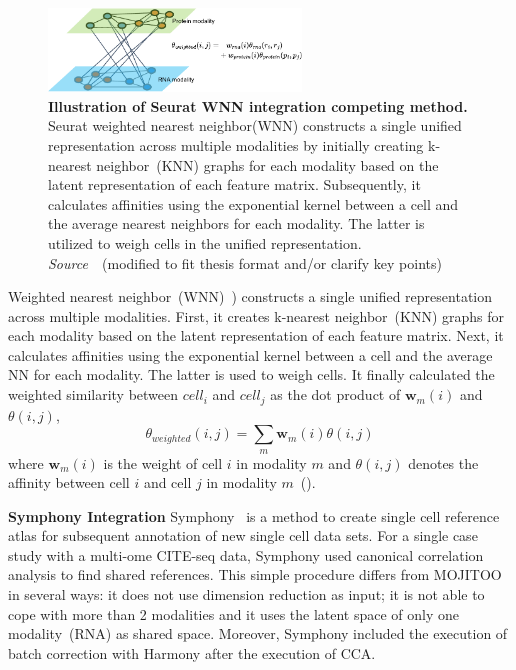 \begin{description}
\begin{figure}[!h]
  	\centering
  	\includegraphics[width=0.60\textwidth]{Alg_WNN/fig}
  	\vspace{0.1cm}
  	\caption[Illustration of Seurat WNN integration competing method.]{\textbf{Illustration of Seurat WNN integration competing method.} Seurat weighted nearest neighbor(WNN) constructs a single unified representation across multiple modalities by initially creating k-nearest neighbor~(KNN) graphs for each modality based on the latent representation of each feature matrix. Subsequently, it calculates affinities using the exponential kernel between a cell and the average nearest neighbors for each modality. The latter is utilized to weigh cells in the unified representation. \emph{Source~\cite{hao2021seurat4}}~(modified to fit thesis format and/or clarify key points)
  }
  	\label{fig:Alg_WNN}
\end{figure}

  \item[Seurat WNN]
  Weighted nearest neighbor~(WNN)~\citep{hao2021seurat4}) constructs a single unified representation across multiple modalities. First, it creates k-nearest neighbor~(KNN) graphs for each modality based on the latent representation of each feature matrix. Next, it calculates affinities using the exponential kernel between a cell and the average NN for each modality. The latter is used to weigh cells. It finally calculated the weighted similarity between $cell_i$ and $cell_j$ as the dot product of $\textbf{w}_m(i)$ and $\theta(i,j)$,
  \begin{equation}
  	\theta_{weighted}(i,j)=\sum_{m} \textbf{w}_m(i)\theta(i,j)
  \end{equation}
  where $\textbf{w}_m(i)$ is the weight of cell $i$ in modality $m$ and $\theta(i,j)$ denotes the affinity between cell $i$ and cell $j$ in modality $m$~().


  \item \textbf{Symphony Integration}
  Symphony~\citep{kang2021symphony} is a method to create single cell reference atlas for subsequent annotation of new single cell data sets. For a single case study with a multi-ome CITE-seq data, Symphony used canonical correlation analysis to find shared references. This simple procedure differs from MOJITOO in several ways: it does not use dimension reduction as input; it is not able to cope with more than 2 modalities and it uses the latent space of only one modality~(RNA) as shared space. Moreover, Symphony included the execution of batch correction with Harmony after the execution of CCA.

\end{description}


